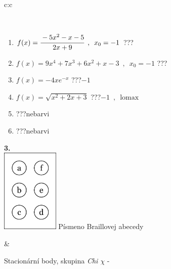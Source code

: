 \documentclass[10pt]{report}
\begin{document}
\begin{tabular}{c:c}
\begin{minipage}[c][104.5mm][t]{0.5\linewidth}
\begin{center}
\begin{minipage}{0.95\linewidth}
\begin{center}
\end{center}
\end{minipage}
\\[1mm]
\begin{minipage}{0.79\linewidth}
\begin{center}
\begin{varwidth}{\linewidth}
\begin{enumerate}
\normalsize
\item $f(x)=\cfrac{-5x^2-x-5}{2x+9}\enspace , \enspace x_0=-1$\quad \dotfill\; ???\;\dotfill \quad {}
\item $f(x)=9x^4+7x^3+6x^2+x-3\enspace , \enspace x_0=-1$\quad \dotfill\; ???\;\dotfill \quad {}
\item $f(x)=-4xe^{-x}$\quad \dotfill\; ???\;\dotfill \quad $-1$
\item $f(x)=\sqrt{x^2+2x+3}$\quad \dotfill\; ???\;\dotfill \quad $-1\enspace , \enspace\mathrm{lomax}$
\item \quad \dotfill\; ???\;\dotfill \quad nebarvi
\item \quad \dotfill\; ???\;\dotfill \quad nebarvi
\end{enumerate}
\end{varwidth}
\end{center}
\end{minipage}
\begin{minipage}{0.20\linewidth}
\begin{center}
{\Huge\bfseries 3.} \\[2mm]
\includegraphics[height=40mm]{../images/braille.png}
{\small Písmeno Braillovej abecedy}
\end{center}
\end{minipage}
\end{center}
\end{minipage}
&
\begin{minipage}[c][104.5mm][t]{0.5\linewidth}
\begin{center}
\vspace{7mm}
{\huge Stacionární body, skupina \textit{Chi $\chi$} -}\\[5mm]

\end{center}
\end{minipage}
\end{tabular}
\end{document}
